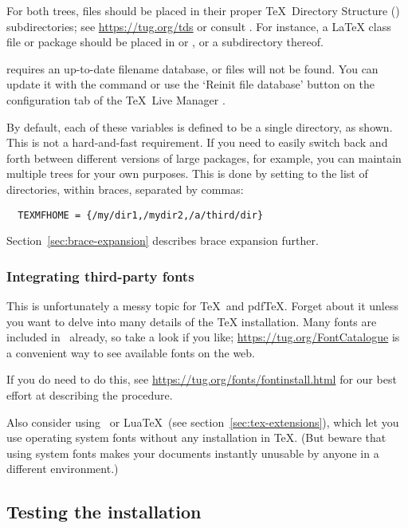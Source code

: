 \documentclass{article}
\begin{document}
For both trees, files should be placed in their proper \TeX\ Directory
Structure (\TDS) subdirectories; see \url{https://tug.org/tds} or consult
. For instance, a \LaTeX{} class file or
package should be placed in  or
, or a subdirectory thereof.

 requires an up-to-date filename database, or files
will not be found.  You can update it with the command
 or use the `Reinit file database' button on the
configuration tab of the \TeX\ Live Manager \GUI.

By default, each of these variables is defined to be a single directory,
as shown.  This is not a hard-and-fast requirement.  If you need to
easily switch back and forth between different versions of large
packages, for example, you can maintain multiple trees for your own
purposes.  This is done by setting  to the
list of directories, within braces, separated by commas:

\begin{verbatim}
  TEXMFHOME = {/my/dir1,/mydir2,/a/third/dir}
\end{verbatim}

Section~\ref{sec:brace-expansion} describes brace expansion further.


\subsubsection{Integrating third-party fonts}

This is unfortunately a messy topic for \TeX\ and pdf\TeX.  Forget
about it unless you want to delve into many details of the \TeX{}
installation.  Many fonts are included in \TL\ already, so take a
look if you like; \url{https://tug.org/FontCatalogue} is a convenient
way to see available fonts on the web.

If you do need to do this, see
\url{https://tug.org/fonts/fontinstall.html} for our best effort at
describing the procedure.

Also consider using \XeTeX\ or Lua\TeX\ (see
section~\ref{sec:tex-extensions}), which let you use operating
system fonts without any installation in \TeX. (But beware that using
system fonts makes your documents instantly unusable by anyone in a
different environment.)

\subsection{Testing the installation}
\label{sec:test-install}
\end{document}
